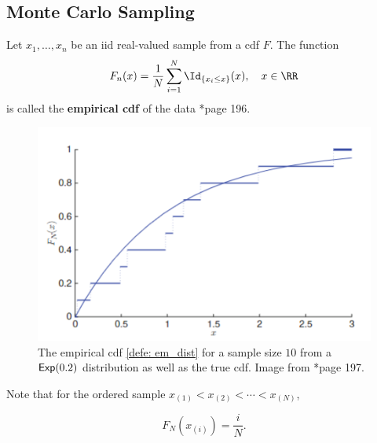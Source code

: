 \subsection*{Monte Carlo Sampling}


\begin{defe} \label{defe: em_dist}
    Let $x_1 , \ldots , x_n$ be an iid real-valued sample from a cdf $F$. The function
    \begin{equation*}
        F_{n} (x) = \frac{1}{N} \sum_{i=1}^{N} \Id_{\left\{ x_i \leq x \right\}} (x) , \quad x \in \RR
    \end{equation*}
    is called the {\bf empirical cdf} of the data \cite{KroeseDirkP2013SMaC}*{page 196}.
\end{defe}

\begin{figure}[ht]
    \centering
    \includegraphics[scale=1.0]{img/bay_inf/emp_cdf_exp_1.png}
    \caption{The empirical cdf \ref{defe: em_dist} for a sample size $10$ from a ${\sf Exp} (0.2)$ distribution as well as the true cdf. Image from \cite{KroeseDirkP2013SMaC}*{page 197}.}
    \label{fig: emp_cdf_exp_1}
\end{figure}

Note that for the ordered sample $x_{(1)} < x_{(2)} < \cdots < x_{(N)}$,

\begin{equation*}
    F_{N} \left( x_{(i)} \right) = \frac{i}{N}.
\end{equation*}

